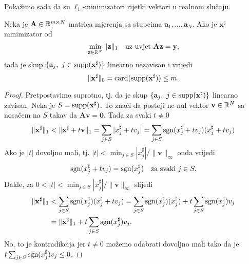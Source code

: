 \documentclass[a4paper,twoside,12pt]{memoir} %
\newcommand{\vect}[1]{\mathbf{#1}}
\renewcommand{\vec}{\vect}
\newcommand{\card}{\text{\normalfont{card}}}
\newcommand{\supp}{\text{\normalfont{supp}}}
\newcommand{\norm}[1]{\|{#1}\|}
\newcommand{\sgn}{\text{\normalfont{sgn}}}
\begin{document}
\noindent Poka\v{z}imo sada da su $\ell_1$-minimizatori rijetki vektori u realnom slu\v{c}aju.
\begin{thm}
    Neka je $\vec A \in \R^{m \times N}$ matrica mjerenja sa stupcima $\vec a_1, \dots, \vec a_N$. Ako je $\vec x^{\sharp}$ minimizator od
    \begin{equation*}
        \min_{\vec z \in \R^N} \norm{\vec z}_1\quad \text{uz uvjet } \vec{Az}=\vec y,
    \end{equation*}
    tada je skup $\{\vec a_j,\ j \in \supp(\vec x^{\sharp})\}$ linearno nezavisan i vrijedi
    \begin{equation*}
        \norm{\vec{x}^{\sharp}}_0 = \card(\supp(\vec x^{\sharp})) \leq m. 
    \end{equation*}
\end{thm}
\begin{proof}
    Pretpostavimo suprotno, tj. da je skup $\{\vec a_j,\ j \in \supp(\vec x^{\sharp})\}$ linearno zavisan. Neka je $S= \supp(\vec x^{\sharp})$. To zna\v{c}i da postoji ne-nul vektor $\vec v \in \R^N$ sa nosa\v{c}em na $S$ takav da $\vec{Av} = \vec 0$. Tada za svaki $t \not= 0$
    \begin{equation*}
        \norm{\vec x^{\sharp}}_1 < \norm{\vec x^{\sharp} + t \vec v}_1 = \sum_{j \in S}|x_j^{\sharp} + tv_j| = \sum_{j \in S}\sgn(x_j^{\sharp}+tv_j)(x_j^{\sharp}+tv_j)
    \end{equation*}
    Ako je $|t|$ dovoljno mali, tj. $|t| < \min_{j \in S}|x_j^{\sharp}|/ \norm{\vec v}_{\infty}$ onda vrijedi
    \begin{equation*}
        \sgn(x_j^{\sharp}+tv_j) = \sgn(x_j^{\sharp})\quad \text{za svaki }j \in S.
    \end{equation*}
    Dakle, za $0<|t|<\min_{j \in S}|x_j^{\sharp}|/ \norm{\vec v}_{\infty}$ slijedi
    \begin{equation*}
    \begin{split}
        \norm{\vec x^{\sharp}}_1 & <  \sum_{j \in S} \sgn(x_j^{\sharp})(x_j^{\sharp}+tv_j)=\sum_{j \in S} \sgn(x_j^{\sharp})(x_j^{\sharp})+t \sum_{j \in S}\sgn(x_j^{\sharp})v_j \\ &= \norm{\vec x^{\sharp}}_1 + t \sum_{j \in S}\sgn(x_j^{\sharp})v_j.
    \end{split}
    \end{equation*}
    No, to je kontradikcija jer $t \not = 0$ mo\v{z}emo odabrati dovoljno mali tako da je \\ $t \sum_{j \in S}\sgn(x_j^{\sharp})v_j \leq 0$.
\end{proof}
\end{document}
